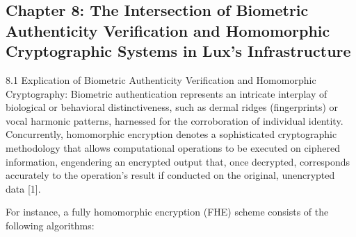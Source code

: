 \documentclass[11pt]{article}
\begin{document}
\subsection{Chapter 8: The Intersection of Biometric Authenticity Verification and Homomorphic Cryptographic Systems in Lux's Infrastructure}

8.1 Explication of Biometric Authenticity Verification and Homomorphic Cryptography: Biometric authentication represents an intricate interplay of biological or behavioral distinctiveness, such as dermal ridges (fingerprints) or vocal harmonic patterns, harnessed for the corroboration of individual identity. Concurrently, homomorphic encryption denotes a sophisticated cryptographic methodology that allows computational operations to be executed on ciphered information, engendering an encrypted output that, once decrypted, corresponds accurately to the operation's result if conducted on the original, unencrypted data [1].


For instance, a fully homomorphic encryption (FHE) scheme consists of the following algorithms:
\end{document}
